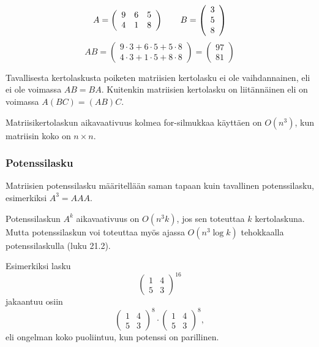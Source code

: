 \[
A = \left( \begin{array}{ccc}
9 & 6 & 5 \\
4 & 1 & 8 \end{array} \right)
\hspace{20px}
B = \left( \begin{array}{c}
3 \\
5 \\
8 \end{array} \right)
\]
\[
AB =
\left( \begin{array}{c}
9 \cdot 3 + 6 \cdot 5 + 5 \cdot 8 \\
4 \cdot 3 + 1 \cdot 5 + 8 \cdot 8 \end{array} \right)
=
\left( \begin{array}{ccc}
97 \\
81 \end{array} \right)
\] 

Tavallisesta kertolaskusta poiketen matriisien
kertolasku ei ole vaihdannainen,
eli ei ole voimassa $AB = BA$.
Kuitenkin matriisien kertolasku
on liitännäinen eli
on voimassa $A(BC)=(AB)C$.

Matriisikertolaskun aikavaativuus kolmea for-silmukkaa
käyttäen on $O(n^3)$, kun matriisin koko on $n \times n$.

\subsubsection*{Potenssilasku}

Matriisien potenssilasku määritellään
saman tapaan kuin tavallinen potenssilasku,
esimerkiksi $A^3=AAA$.

Potenssilaskun $A^k$ aikavaativuus on $O(n^3 k)$,
jos sen toteuttaa $k$ kertolaskuna.
Mutta potenssilaskun voi toteuttaa
myös ajassa $O(n^3 \log k)$ tehokkaalla
potenssilaskulla (luku 21.2).

Esimerkiksi lasku
\[
\left( \begin{array}{cc}
1 & 4 \\
5 & 3 \end{array} \right)^{16}
\]
jakaantuu osiin
\[
\left( \begin{array}{cc}
1 & 4 \\
5 & 3 \end{array} \right)^{8}
\cdot
\left( \begin{array}{cc}
1 & 4 \\
5 & 3 \end{array} \right)^{8},
\]
eli ongelman koko puoliintuu,
kun potenssi on parillinen.

